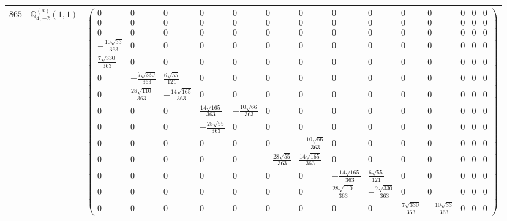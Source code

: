 \documentclass[fleqn,8pt,landscape]{jsarticle}
\begin{document}
\begin{center}
\begin{longtable}{ccc}
$ 865 $ & $ \mathbb{Q}_{4,-2}^{(a)}(1,1) $ & $ \begin{pmatrix} 0 & 0 & 0 & 0 & 0 & 0 & 0 & 0 & 0 & 0 & 0 & 0 & 0 & 0 \\ 0 & 0 & 0 & 0 & 0 & 0 & 0 & 0 & 0 & 0 & 0 & 0 & 0 & 0 \\ 0 & 0 & 0 & 0 & 0 & 0 & 0 & 0 & 0 & 0 & 0 & 0 & 0 & 0 \\ - \frac{10 \sqrt{33}}{363} & 0 & 0 & 0 & 0 & 0 & 0 & 0 & 0 & 0 & 0 & 0 & 0 & 0 \\ \frac{7 \sqrt{330}}{363} & 0 & 0 & 0 & 0 & 0 & 0 & 0 & 0 & 0 & 0 & 0 & 0 & 0 \\ 0 & - \frac{7 \sqrt{330}}{363} & \frac{6 \sqrt{55}}{121} & 0 & 0 & 0 & 0 & 0 & 0 & 0 & 0 & 0 & 0 & 0 \\ 0 & \frac{28 \sqrt{110}}{363} & - \frac{14 \sqrt{165}}{363} & 0 & 0 & 0 & 0 & 0 & 0 & 0 & 0 & 0 & 0 & 0 \\ 0 & 0 & 0 & \frac{14 \sqrt{165}}{363} & - \frac{10 \sqrt{66}}{363} & 0 & 0 & 0 & 0 & 0 & 0 & 0 & 0 & 0 \\ 0 & 0 & 0 & - \frac{28 \sqrt{55}}{363} & 0 & 0 & 0 & 0 & 0 & 0 & 0 & 0 & 0 & 0 \\ 0 & 0 & 0 & 0 & 0 & 0 & - \frac{10 \sqrt{66}}{363} & 0 & 0 & 0 & 0 & 0 & 0 & 0 \\ 0 & 0 & 0 & 0 & 0 & - \frac{28 \sqrt{55}}{363} & \frac{14 \sqrt{165}}{363} & 0 & 0 & 0 & 0 & 0 & 0 & 0 \\ 0 & 0 & 0 & 0 & 0 & 0 & 0 & - \frac{14 \sqrt{165}}{363} & \frac{6 \sqrt{55}}{121} & 0 & 0 & 0 & 0 & 0 \\ 0 & 0 & 0 & 0 & 0 & 0 & 0 & \frac{28 \sqrt{110}}{363} & - \frac{7 \sqrt{330}}{363} & 0 & 0 & 0 & 0 & 0 \\ 0 & 0 & 0 & 0 & 0 & 0 & 0 & 0 & 0 & \frac{7 \sqrt{330}}{363} & - \frac{10 \sqrt{33}}{363} & 0 & 0 & 0 \end{pmatrix} $ \\ \hline

\end{longtable}
\end{center}
\end{document}

